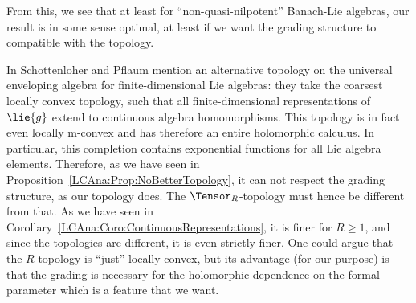 From this, we see that at least for ``non-quasi-nilpotent'' Banach-Lie 
algebras, our result is in some sense optimal, at least if we want the grading 
structure to compatible with the topology.
\begin{remark}
    \label{Rem:LCAnaBCHConvergence}
    In \cite{pflaum.schottenloher:1998a} Schottenloher and Pflaum mention an 
    alternative topology on the universal enveloping algebra for 
    finite-dimensional Lie algebras: they take the coarsest locally convex 
    topology, such that all finite-dimensional representations of $\lie{g}$ 
    extend to continuous algebra homomorphisms. This topology is in fact even 
    locally m-convex and has therefore an entire holomorphic calculus. In 
    particular, this completion contains exponential functions for all Lie 
    algebra elements. Therefore, as we have seen in 
    Proposition~\ref{LCAna:Prop:NoBetterTopology}, it can not respect the 
    grading structure, as our topology does. The $\Tensor_R$-topology must 
    hence be different from that. As we have seen in 
    Corollary~\ref{LCAna:Coro:ContinuousRepresentations}, it is finer for 
    $R \geq 1$, and since the topologies are different, it is even strictly 
    finer. One could argue that the $R$-topology is ``just'' locally convex, 
    but its advantage (for our purpose) is that the grading is necessary for 
    the holomorphic dependence on the formal parameter which is a feature that 
    we want.
\end{remark}
